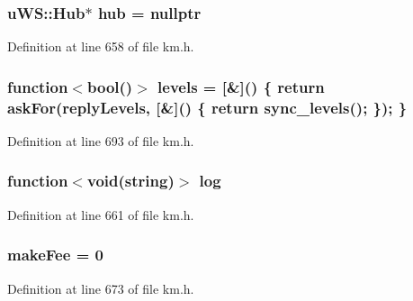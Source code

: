 \subsubsection[{\texorpdfstring{hub}{hub}}]{\setlength{\rightskip}{0pt plus 5cm}u\+W\+S\+::\+Hub$\ast$ hub = nullptr}\hypertarget{class_k_1_1_gw_a33b00844a7c4d5c91a4696d71e02bafd}{}\label{class_k_1_1_gw_a33b00844a7c4d5c91a4696d71e02bafd}


Definition at line 658 of file km.\+h.

\subsubsection[{\texorpdfstring{levels}{levels}}]{\setlength{\rightskip}{0pt plus 5cm}function$<$bool()$>$ levels = \mbox{[}\&\mbox{]}() \{ return {\bf ask\+For}({\bf reply\+Levels}, \mbox{[}\&\mbox{]}() \{ return {\bf sync\+\_\+levels}(); \}); \}}\hypertarget{class_k_1_1_gw_a167ae09c2d39a1aee89c080bf58c7fb3}{}\label{class_k_1_1_gw_a167ae09c2d39a1aee89c080bf58c7fb3}


Definition at line 693 of file km.\+h.

\subsubsection[{\texorpdfstring{log}{log}}]{\setlength{\rightskip}{0pt plus 5cm}function$<$void(string)$>$ log}\hypertarget{class_k_1_1_gw_a45c045408bc39a1e18f99b18505a0859}{}\label{class_k_1_1_gw_a45c045408bc39a1e18f99b18505a0859}


Definition at line 661 of file km.\+h.

\subsubsection[{\texorpdfstring{make\+Fee}{makeFee}}]{ make\+Fee = 0}\hypertarget{class_k_1_1_gw_a379233bfc2ba83fd276d17dbe2e37009}{}\label{class_k_1_1_gw_a379233bfc2ba83fd276d17dbe2e37009}


Definition at line 673 of file km.\+h.

